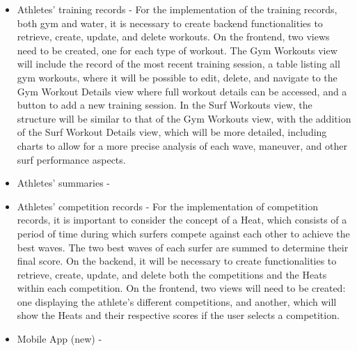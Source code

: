 \documentclass[a4paper,twoside,11pt]{article}
\begin{document}
\begin{itemize}
\item Athletes' training records - For the implementation of the training records, both gym and water, it is necessary to create backend functionalities to retrieve, create, update, and delete workouts. On the frontend, two views need to be created, one for each type of workout. The Gym Workouts view will include the record of the most recent training session, a table listing all gym workouts, where it will be possible to edit, delete, and navigate to the Gym Workout Details view where full workout details can be accessed, and a button to add a new training session. In the Surf Workouts view, the structure will be similar to that of the Gym Workouts view, with the addition of the Surf Workout Details view, which will be more detailed, including charts to allow for a more precise analysis of each wave, maneuver, and other surf performance aspects.

\item Athletes' summaries - 

\item Athletes' competition records - For the implementation of competition records, it is important to consider the concept of a Heat, which consists of a period of time during which surfers compete against each other to achieve the best waves. The two best waves of each surfer are summed to determine their final score. On the backend, it will be necessary to create functionalities to retrieve, create, update, and delete both the competitions and the Heats within each competition. On the frontend, two views will need to be created: one displaying the athlete’s different competitions, and another, which will show the Heats and their respective scores if the user selects a competition.

\item Mobile App (new) - 
\end{itemize}

% 
% 
\end{document}
